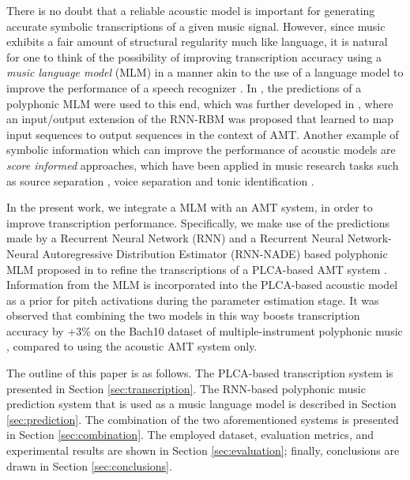 There is no doubt that a reliable acoustic model is important for generating accurate symbolic transcriptions of a given music signal. However, since music exhibits a fair amount of structural regularity much like language, it is natural for one to think of the possibility of improving transcription accuracy using a \textit{music language model} (MLM) in a manner akin to the use of a language model to improve the performance of a speech recognizer \cite{Rabiner1993}. In \cite{Boulanger-Lewandowski2012}, the predictions of a polyphonic MLM were used to this end, which was further developed in \cite{Boulanger-Lewandowski2013}, where an input/output extension of the RNN-RBM was proposed that learned to map input sequences to output sequences in the context of AMT. Another example of symbolic information which can improve the performance of acoustic models are \textit{score informed} approaches, which have been applied in music research tasks such as source separation \cite{Ewert2012}, voice separation \cite{
Ewert2011} and tonic identification \cite{Senturk2013}. %

In the present work, we integrate a MLM with an AMT system, in order to improve transcription performance. Specifically, we make use of the predictions made by a Recurrent Neural Network (RNN) and a Recurrent Neural Network-Neural Autoregressive Distribution Estimator (RNN-NADE) based polyphonic MLM proposed in \cite{Boulanger-Lewandowski2012} to refine the transcriptions of a PLCA-based AMT system \cite{Benetos2012, Benetos2013}. Information from the MLM is incorporated into the PLCA-based acoustic model as a prior for pitch activations during the parameter estimation stage. It was observed that combining the two models in this way boosts transcription accuracy by +3\% on the Bach10 dataset of multiple-instrument polyphonic music \cite{Duan2010}, compared to using the acoustic AMT system only.

The outline of this paper is as follows. The PLCA-based transcription system is presented in Section \ref{sec:transcription}. The RNN-based polyphonic music prediction system that is used as a music language model is described in Section \ref{sec:prediction}. The combination of the two aforementioned systems is presented in Section \ref{sec:combination}. The employed dataset, evaluation metrics, and experimental results are shown in Section \ref{sec:evaluation}; finally, conclusions are drawn in Section \ref{sec:conclusions}.